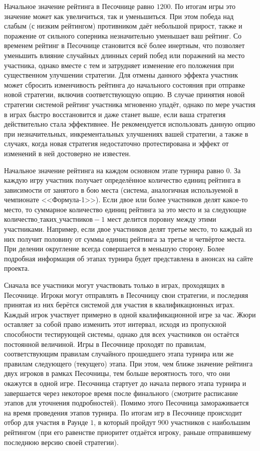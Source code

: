 Начальное значение рейтинга в Песочнице равно $1200$. По итогам игры это значение может как увеличиться, так и уменьшиться. При этом победа
над слабым (с низким рейтингом) противником даёт небольшой прирост, также и поражение от сильного соперника незначительно уменьшает ваш
рейтинг. Со временем рейтинг в Песочнице становится всё более инертным, что позволяет уменьшить влияние случайных длинных серий побед или
поражений на место участника, однако вместе с тем и затрудняет изменение его положения при существенном улучшении стратегии. Для отмены
данного эффекта участник может сбросить изменчивость рейтинга до начального состояния при отправке новой стратегии, включив соответствующую
опцию. В случае принятия новой стратегии системой рейтинг участника мгновенно упадёт, однако по мере участия в играх быстро восстановится и
даже станет выше, если ваша стратегия действительно стала эффективнее. Не рекомендуется использовать данную опцию при незначительных,
инкрементальных улучшениях вашей стратегии, а также в случаях, когда новая стратегия недостаточно протестирована и эффект от изменений в
ней достоверно не известен.

Начальное значение рейтинга на каждом основном этапе турнира равно $0$. За каждую игру участник получает определённое количество единиц
рейтинга в зависимости от занятого в бою места (система, аналогичная используемой в чемпионате <<Формула-1>>). Если двое или более
участников делят какое-то место, то суммарное количество единиц рейтинга за это место и за следующие
$\texttt{количество\_таких\_участников}-1$ мест делится поровну между этими участниками. Например, если двое участников делят третье место,
то каждый из них получит половину от суммы единиц рейтинга за третье и четвёртое места. При делении округление всегда совершается в меньшую
сторону. Более подробная информация об этапах турнира будет представлена в анонсах на сайте проекта.

Сначала все участники могут участвовать только в играх, проходящих в Песочнице. Игроки могут отправлять в Песочницу свои стратегии, и
последняя принятая из них берётся системой для участия в квалификационных играх. Каждый игрок участвует примерно в одной квалификационной
игре за час. Жюри оставляет за собой право изменить этот интервал, исходя из пропускной способности тестирующей системы, однако для всех
участников он остаётся постоянной величиной. Игры в Песочнице проходят по правилам, соответствующим правилам случайного прошедшего этапа
турнира или же правилам следующего (текущего) этапа. При этом, чем ближе значение рейтинга двух игроков в рамках Песочницы, тем больше
вероятность того, что они окажутся в одной игре. Песочница стартует до начала первого этапа турнира и завершается через некоторое время
после финального (смотрите расписание этапов для уточнения подробностей). Помимо этого Песочница замораживается на время проведения этапов
турнира. По итогам игр в Песочнице происходит отбор для участия в Раунде $1$, в который пройдут $900$ участников с наибольшим рейтингом (при
его равенстве приоритет отдаётся игроку, раньше отправившему последнюю версию своей стратегии).

